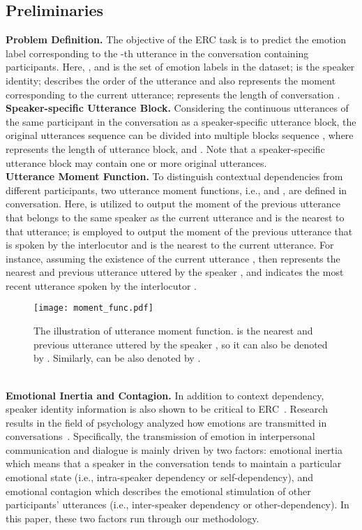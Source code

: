 \documentclass{SCIS2019}
\begin{document}
\subsection{Preliminaries}
\textbf{Problem Definition.} The objective of the ERC task is to predict the emotion label  corresponding to the -th utterance  in the conversation  containing  participants. Here, , and  is the set of emotion labels in the dataset;  is the speaker identity;  describes the order of the utterance and also represents the moment corresponding to the current utterance;  represents the length of conversation .
\\ \noindent 
\textbf{Speaker-specific Utterance Block.} Considering the continuous utterances of the same participant in the conversation as a speaker-specific utterance block, the original utterances sequence can be divided into multiple blocks sequence , where  represents the length of utterance block, and . Note that a speaker-specific utterance block may contain one or more original utterances.
\\ \noindent 
\textbf{Utterance Moment Function.} To distinguish contextual dependencies from different participants, two utterance moment functions, i.e.,  and , are defined in conversation. Here,  is utilized to output the moment of the previous utterance that belongs to the same speaker as the current utterance and is the nearest to that utterance;  is employed to output the moment of the previous utterance that is spoken by the interlocutor and is the nearest to the current utterance. For instance, assuming the existence of the current utterance , then  represents the nearest and previous utterance uttered by the speaker , and  indicates the most recent utterance spoken by the interlocutor .
\begin{figure}[htbp]
	\centering
	\texttt{[image: moment\_func.pdf]}
	\caption{The illustration of utterance moment function.  is the nearest and previous utterance uttered by the speaker , so it can also be denoted by . Similarly,  can be also denoted by .} 
	\label{fig:moment_func}
\end{figure}
\\ \noindent 
\textbf{Emotional Inertia and Contagion.} In addition to context dependency, speaker identity information is also shown to be critical to ERC~\cite{lili2020}. Research results in the field of psychology analyzed how emotions are transmitted in conversations~\cite{Hatfield1993}. Specifically, the transmission of emotion in interpersonal communication and dialogue is mainly driven by two factors: emotional inertia which means that a speaker in the conversation tends to maintain a particular emotional state (i.e., intra-speaker dependency or self-dependency), and emotional contagion which describes the emotional stimulation of other participants' utterances (i.e., inter-speaker dependency or other-dependency). In this paper, these two factors run through our methodology.
\end{document}
